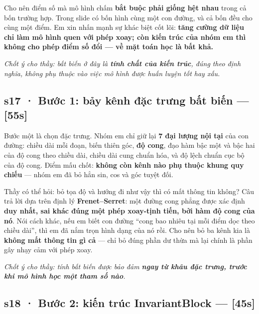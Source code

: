 \documentclass[
  11pt,
]{article}
\renewenvironment{quote}
  {\par\smallskip\noindent
   \def\FrameCommand{{\color{deckorange}\vrule width 2.5pt}\hspace{10pt}}%
   \MakeFramed{\advance\hsize-\width\FrameRestore}%
   \footnotesize\itshape\color{deckslate}}
  {\par\endMakeFramed\smallskip}
\begin{document}
Cho nên điểm số mà mô hình chấm \textbf{bắt buộc phải giống hệt nhau}
trong cả bốn trường hợp. Trong slide có bốn hình cùng một con đường, và
cả bốn đều cho cùng một điểm. Em xin nhấn mạnh sự khác biệt cốt lõi:
\textbf{tăng cường dữ liệu chỉ làm mô hình quen với phép xoay; còn kiến
trúc của nhóm em thì không cho phép điểm số đổi --- về mặt toán học là
bất khả.}

\begin{quote}
Chốt ý cho thầy: bất biến ở đây là \textbf{tính chất của kiến trúc},
đúng theo định nghĩa, không phụ thuộc vào việc mô hình được huấn luyện
tốt hay xấu.
\end{quote}

\subsection{s17 · Bước 1: bảy kênh đặc trưng bất biến ---
{[}55s{]}}\label{s17-bux1b0ux1edbc-1-bux1ea3y-kuxeanh-ux111ux1eb7c-trux1b0ng-bux1ea5t-biux1ebfn-55s}

Bước một là chọn đặc trưng. Nhóm em chỉ giữ lại \textbf{7 đại lượng nội
tại} của con đường: chiều dài mỗi đoạn, biến thiên góc, \textbf{độ
cong}, đạo hàm bậc một và bậc hai của độ cong theo chiều dài, chiều dài
cung chuẩn hóa, và độ lệch chuẩn cục bộ của độ cong. Điểm mấu chốt:
\textbf{không còn kênh nào phụ thuộc khung quy chiếu} --- nhóm em đã bỏ
hẳn sin, cos và góc tuyệt đối.

Thầy có thể hỏi: bỏ tọa độ và hướng đi như vậy thì có mất thông tin
không? Câu trả lời dựa trên định lý \textbf{Frenet--Serret}: một đường
cong phẳng được xác định \textbf{duy nhất, sai khác đúng một phép
xoay-tịnh tiến, bởi hàm độ cong của nó}. Nói cách khác, nếu em biết con
đường ``cong bao nhiêu tại mỗi điểm dọc theo chiều dài'', thì em đã nắm
trọn hình dạng của nó rồi. Cho nên bỏ ba kênh kia là \textbf{không mất
thông tin gì cả} --- chỉ bỏ đúng phần dư thừa mà lại chính là phần gây
nhạy cảm với phép xoay.

\begin{quote}
Chốt ý cho thầy: tính bất biến được bảo đảm \textbf{ngay từ khâu đặc
trưng, trước khi mô hình học một tham số nào}.
\end{quote}

\subsection{s18 · Bước 2: kiến trúc InvariantBlock ---
{[}45s{]}}\label{s18-bux1b0ux1edbc-2-kiux1ebfn-truxfac-invariantblock-45s}
\end{document}
